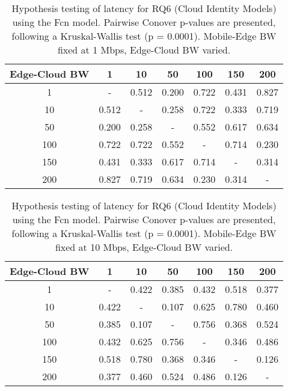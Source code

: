 \begin{table}[H]
\caption{Hypothesis testing of latency for RQ6 (Cloud Identity Models) using the Fcn model. Pairwise Conover p-values are presented, following a Kruskal-Wallis test (p = 0.0001). Mobile-Edge BW fixed at 1 Mbps, Edge-Cloud BW varied.}
\centering
\begin{tabular}{c|cccccc}
Edge-Cloud BW & 1 & 10 & 50 & 100 & 150 & 200 \\
\hline
1 & - & 0.512 & 0.200 & 0.722 & 0.431 & 0.827 \\
10 & 0.512 & - & 0.258 & 0.722 & 0.333 & 0.719 \\
50 & 0.200 & 0.258 & - & 0.552 & 0.617 & 0.634 \\
100 & 0.722 & 0.722 & 0.552 & - & 0.714 & 0.230 \\
150 & 0.431 & 0.333 & 0.617 & 0.714 & - & 0.314 \\
200 & 0.827 & 0.719 & 0.634 & 0.230 & 0.314 & - \\
\end{tabular}
\end{table}

\begin{table}[H]
\caption{Hypothesis testing of latency for RQ6 (Cloud Identity Models) using the Fcn model. Pairwise Conover p-values are presented, following a Kruskal-Wallis test (p = 0.0001). Mobile-Edge BW fixed at 10 Mbps, Edge-Cloud BW varied.}
\centering
\begin{tabular}{c|cccccc}
Edge-Cloud BW & 1 & 10 & 50 & 100 & 150 & 200 \\
\hline
1 & - & 0.422 & 0.385 & 0.432 & 0.518 & 0.377 \\
10 & 0.422 & - & 0.107 & 0.625 & 0.780 & 0.460 \\
50 & 0.385 & 0.107 & - & 0.756 & 0.368 & 0.524 \\
100 & 0.432 & 0.625 & 0.756 & - & 0.346 & 0.486 \\
150 & 0.518 & 0.780 & 0.368 & 0.346 & - & 0.126 \\
200 & 0.377 & 0.460 & 0.524 & 0.486 & 0.126 & - \\
\end{tabular}
\end{table}

